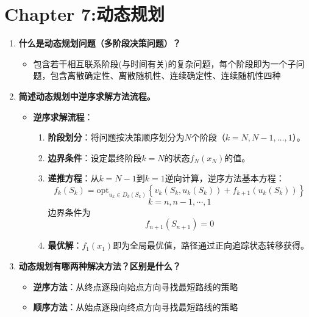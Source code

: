 	\section{Chapter 7:动态规划}
		\begin{enumerate}
		\item \textbf{什么是动态规划问题（多阶段决策问题）？ }
		\begin{itemize}
			\item 包含若干相互联系阶段(与时间有关)的复杂问题，每个阶段即为一个子问题，包含离散确定性、离散随机性、连续确定性、连续随机性四种
		\end{itemize}
		\item \textbf{简述动态规划中逆序求解方法流程。}
		\begin{itemize}
			\item \textbf{逆序求解流程}：
			\begin{enumerate}
				\item \textbf{阶段划分}：将问题按决策顺序划分为$N$个阶段（$k=N,N-1,\dots,1$）。
				\item \textbf{边界条件}：设定最终阶段$k=N$的状态$f_N(x_N)$的值。
				\item \textbf{递推方程}：从$k=N-1$到$k=1$逆向计算，逆序方法基本方程：
				\[f_k(S_k) = \text{opt}_{u_k \in D_k(S_k)} \left\{ v_k(S_k, u_k(S_k)) + f_{k+1}(u_k(S_k)) \right\}\]
				\[k = n, n-1, \cdots, 1\]
				边界条件为\[f_{n+1}(S_{n+1}) = 0\]
				\item \textbf{最优解}：$f_1(x_1)$即为全局最优值，路径通过正向追踪状态转移获得。
			\end{enumerate}
		\end{itemize}
		\item \textbf{动态规划有哪两种解决方法？区别是什么？ }
		\begin{itemize}
			\item \textbf{逆序方法}：从终点逐段向始点方向寻找最短路线的策略
			\item \textbf{顺序方法}：从始点逐段向终点方向寻找最短路线的策略
		\end{itemize}
		\end{enumerate}
